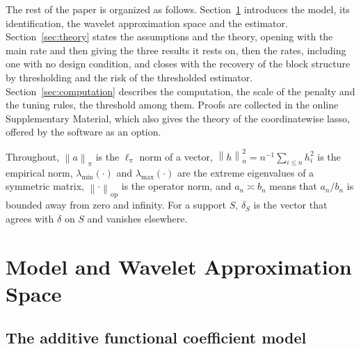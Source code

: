 \documentclass[12pt]{article} %
\theoremstyle{definition}
\theoremstyle{plain}
\newcommand{\norm}[1]{\left\lVert #1 \right\rVert}
\newcommand{\normn}[1]{\left\lVert #1 \right\rVert_{n}}
\newcommand{\lmin}{\lambda_{\min}}
\newcommand{\lmaxx}{\lambda_{\max}}
\newcommand{\opnorm}[1]{\left\lVert #1 \right\rVert_{\mathrm{op}}}
\begin{document}
The rest of the paper is organized as follows. Section~\ref{sec:model}
introduces the model, its identification, the wavelet \textcolor{colR1}{approximation space} and the estimator.
Section~\ref{sec:theory} states the assumptions and the theory, opening with
the main rate and then giving the three results it rests on\textcolor{colR1}{, then
the rates, including one with no design condition,} \textcolor{colR1}{and
closes with the recovery of the block structure by thresholding} \textcolor{colR1}{and
the risk of the thresholded estimator}.
Section~\ref{sec:computation} describes the computation, the scale of the
penalty and the tuning rules\textcolor{colR1}{, the threshold among them}. Proofs are collected in the online Supplementary
Material\textcolor{colR1}{, which also gives the theory of the coordinatewise lasso,
offered by the software as an option}.

Throughout, $\norm{a}_\pi$ is the $\ell_\pi$ norm of a vector,
$\normn{h}^2 = n^{-1}\sum_{i\le n} h_i^2$ is the empirical norm,
$\lmin(\cdot)$ and $\lmaxx(\cdot)$ are the extreme eigenvalues of a symmetric
matrix, $\opnorm{\cdot}$ is the operator norm, and $a_n \asymp b_n$ means that
$a_n/b_n$ is bounded away from zero and infinity. For a support
$S$, $\delta_S$ is the vector that agrees with $\delta$ on $S$ and vanishes
elsewhere.

\section{Model and Wavelet \texorpdfstring{\textcolor{colR1}{Approximation Space}}{Approximation Space}}
\label{sec:model}

\subsection{The additive functional coefficient model}
\label{sec:model-def}
\end{document}

